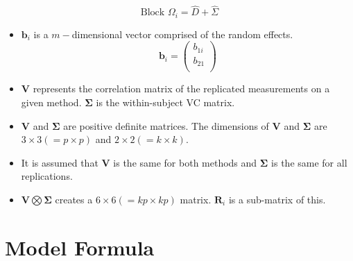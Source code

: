 \documentclass[12pt, a4paper]{report}
\theoremstyle{plain}
\theoremstyle{definition}
\theoremstyle{remark}
\begin{document}
\begin{equation}
\mbox{Block  }\Omega_{i} = \hat{D} + \hat{\Sigma}
\end{equation}
\begin{itemize}
	
	
	\item $\boldsymbol{b}_{i}$ is a $m-$dimensional vector comprised of
	the random effects.
	\begin{equation}
	\boldsymbol{b}_{i} = \left( \begin{array}{c}
	b_{1i} \\
	b_{21}  \\
	\end{array}\right)
	\end{equation}
	
	\item $\boldsymbol{V}$ represents the correlation matrix of the replicated measurements on a given method.
	$\boldsymbol{\Sigma}$ is the within-subject VC matrix.
	
	\item $\boldsymbol{V}$ and $\boldsymbol{\Sigma}$ are positive
	definite matrices. The dimensions of $\boldsymbol{V}$ and
	$\boldsymbol{\Sigma}$ are $3 \times 3 ( = p \times p )$ and $ 2 \times
	2 (= k \times k)$.
	
	\item It is assumed that $\boldsymbol{V}$ is the same for both methods and $\boldsymbol{\Sigma}$ is
	the same for all replications.
	
	\item $\boldsymbol{V} \bigotimes \boldsymbol{\Sigma}$ creates a $ 6 \times 6 ( = kp \times
	kp)$ matrix.
	$\boldsymbol{R}_{i}$ is a sub-matrix of this.
\end{itemize}


\section{Model Formula}
\end{document}
